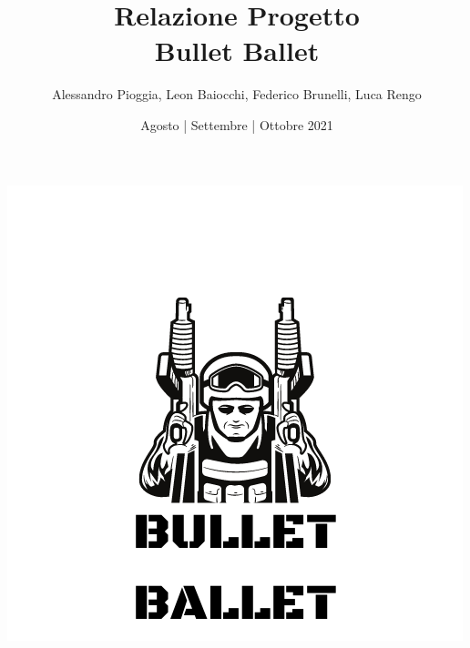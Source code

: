 \documentclass[a4paper,12pt]{report}
\title{Relazione Progetto \\ \textbf{Bullet Ballet}}
\author{Alessandro Pioggia, Leon Baiocchi, Federico Brunelli, Luca Rengo}
\date{Agosto | Settembre | Ottobre 2021}
\begin{document}
\makeatletter
\begin{titlepage}
	\begin{center}
		\includegraphics[width=0.7\linewidth]{img/bullet ballet.png}\\[4ex]
		{\Huge  \@title }\\[3ex] 
		{\large  \@author}\\[3ex] 
		{\large \@date}
	\end{center}
\end{titlepage}
\makeatother
\thispagestyle{empty}
\newpage


\tableofcontents










\end{document}

